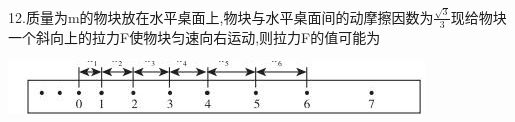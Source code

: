 \begin{solution}{4cm}

\end{solution}



\question[6] 12.质量为m的物块放在水平桌面上,物块与水平桌面间的动摩擦因数为$\frac{\sqrt{3}}{3}$现给物块一个斜向上的拉力F使物块匀速向右运动,则拉力F的值可能为
\begin{center}
\includegraphics[]{img/image12.jpeg}
\end{center}

\begin{solution}{4cm}

\end{solution}



